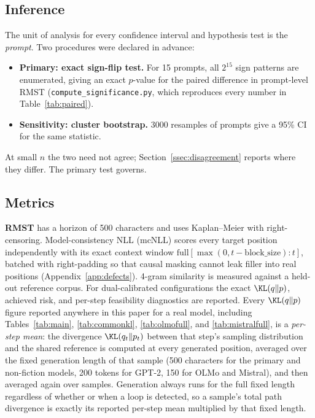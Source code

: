 \subsection{Inference}
\label{ssec:inference}
The unit of analysis for every confidence interval and hypothesis test is the \emph{prompt}. Two procedures were declared in advance:
\begin{itemize}[leftmargin=*]
  \item \textbf{Primary: exact sign-flip test.} For 15 prompts, all $2^{15}$ sign patterns are enumerated, giving an exact $p$-value for the paired difference in prompt-level RMST (\texttt{compute\_\allowbreak{}significance.py}, which reproduces every number in Table~\ref{tab:paired}).
  \item \textbf{Sensitivity: cluster bootstrap.} 3000 resamples of prompts give a 95\% CI for the same statistic.
\end{itemize}
At small $n$ the two need not agree; Section~\ref{ssec:disagreement} reports where they differ. The primary test governs.

\subsection{Metrics}
\textbf{RMST} has a horizon of 500 characters and uses Kaplan--Meier with right-censoring. Model-consistency NLL (mcNLL) scores every target position independently with its exact context window $\text{full}[\max(0,t{-}\text{block\_size}):t]$, batched with right-padding so that causal masking cannot leak filler into real positions (Appendix~\ref{app:defects}). 4-gram similarity is measured against a held-out reference corpus. For dual-calibrated configurations the exact $\KL(q\Vert p)$, achieved risk, and per-step feasibility diagnostics are reported. Every $\KL(q\Vert p)$ figure reported anywhere in this paper for a real model, including Tables~\ref{tab:main}, \ref{tab:commonkl}, \ref{tab:olmofull}, and \ref{tab:mistralfull}, is a \emph{per-step mean}: the divergence $\KL(q_t\Vert p_t)$ between that step's sampling distribution and the shared reference is computed at every generated position, averaged over the fixed generation length of that sample (500 characters for the primary and non-fiction models, 200 tokens for GPT-2, 150 for OLMo and Mistral), and then averaged again over samples. Generation always runs for the full fixed length regardless of whether or when a loop is detected, so a sample's total path divergence is exactly its reported per-step mean multiplied by that fixed length.

